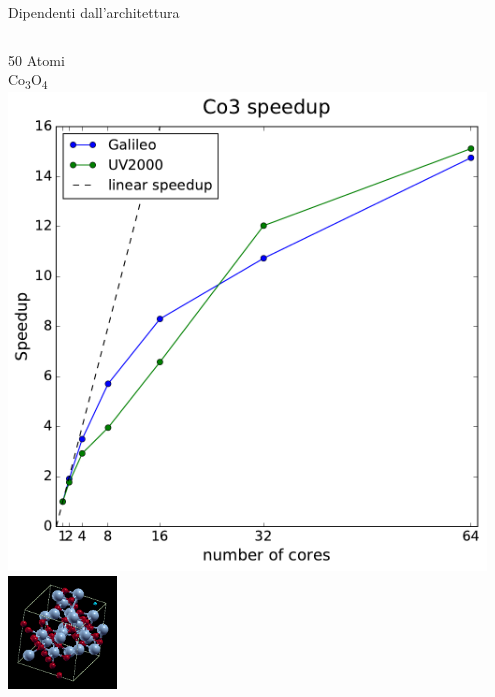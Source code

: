 \documentclass[8pt]{beamer}
\newcommand\CO{Co\textsubscript{3}O\textsubscript{4} }
\begin{document}
\begin{frame}{Dipendenti dall'architettura}
\vspace{-0.5cm}

	\begin{columns}
	\begin{center}	
		50 Atomi\\
		\CO \\
		\includegraphics[width=0.95\textwidth]{beam_concl_co3.pdf}	\\		
		\includegraphics[height=3cm]{beam_co3.png}
	\end{center}


\end{columns}
\end{frame}
\end{document}
